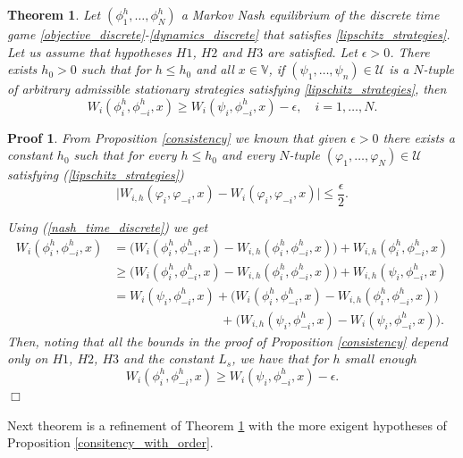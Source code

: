 \documentclass[12pt]{article}
\newtheorem{theorem}{Theorem}
\newtheorem{Proof}{Proof}
\newenvironment{proof}{\begin{Proof}\rm}{\hfill $\Box$ \end{Proof}}
\begin{document}
\begin{theorem}\label{epsilon-Nash}
 Let $(\phi_1^h,\dots,\phi_N^h)$  a Markov Nash equilibrium of the discrete time game
\eqref{objective_discrete}-\eqref{dynamics_discrete} that satisfies \eqref{lipschitz_strategies}. Let us assume that hypotheses $H1$, $H2$ and $H3$ are satisfied. Let  $\epsilon>0$. There exists $h_0>0$ such that for $h\le h_0$  and all $x\in\mathbb{V}$, if $(\psi_1,\dots,\psi_n)\in\mathcal{U}$ is a $N$-tuple of arbitrary admissible stationary strategies satisfying \eqref{lipschitz_strategies}, then
\begin{equation*}
W_i(\phi_i^h,\phi_{-i}^h,x)\ge W_i(\psi_i,\phi_{-i}^h,x)-\epsilon,\quad i=1,\dots, N.
\end{equation*}
\end{theorem}
\begin{proof}
From Proposition \ref{consistency} we known that given $\epsilon>0$ there exists a constant $h_0$ such that for every $h\le h_0$ and every $N$-tuple $(\varphi_1,\dots,\varphi_N)\in\mathcal{U}$ satisfying (\ref{lipschitz_strategies})
$$\bigl|W_{i,h}(\varphi_i,\varphi_{-i},x)-W_i(\varphi_i,\varphi_{-i},x)\bigr|\le \frac{\epsilon}{2}.$$

Using (\ref{nash_time_discrete}) we get
\begin{align*}
W_{i}(\phi_i^h,\phi_{-i}^h,x)
&=\bigl (W_{i}(\phi_i^h,\phi_{-i}^h,x)-W_{i,h}({\phi}_i^h,{\phi}_{-i}^h,x)\bigr )
+W_{i,h}({\phi}_i^h,{\phi}_{-i}^h,x)\\
&\ge\bigl(W_{i}(\phi_i^h,\phi_{-i}^h,x)-W_{i,h}({\phi}_i^h,{\phi}_{-i}^h,x)\bigr)
+W_{i,h}(\psi_i,{\phi}_{-i}^h,x)\\
 &=W_{i}(\psi_i,\phi_{-i}^h,x)
 +\bigl (W_{i}(\phi_i^h,\phi_{-i}^h,x)-W_{i,h}({\phi}_i^h,{\phi}_{-i}^h,x)\bigr)\\
 &\phantom{=W_{i}(\psi_i,\phi_{-i}^h,x))} + \bigl(W_{i,h}({\psi}_i,{\phi}_{-i}^h,x)-W_{i}(\psi_i,\phi_{-i}^h,x)\bigr).
\end{align*}
Then, noting that all the bounds in the proof of  Proposition \ref{consistency} depend only on $H1$, $H2$, $H3$ and the constant $L_s$, we have that for $h$ small enough
\begin{equation*}
W_{i}(\phi_i^h,\phi_{-i}^h,x)
\ge W_{i}(\psi_i,\phi_{-i}^h,x)-\epsilon.
\end{equation*}
\end{proof}
Next theorem is a refinement of Theorem \ref{epsilon-Nash} with the more exigent hypotheses of Proposition \ref{consitency_with_order}.
\end{document}
